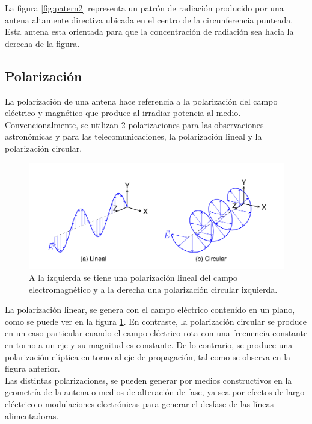 La figura \ref{fig:patern2} representa un patrón de radiación producido por una antena altamente directiva ubicada en el centro de la circunferencia punteada. Esta antena esta orientada para que la concentración de radiación sea hacia la derecha de la figura.

\subsection{Polarización}

La polarización de una antena hace referencia a la polarización del campo eléctrico y magnético que produce al irradiar potencia al medio. Convencionalmente, se utilizan 2 polarizaciones para las observaciones astronómicas y para las telecomunicaciones, la polarización lineal y la polarización circular.\\

\begin{figure}
    \centering
    \includegraphics[width = 15cm]{img/pol.png}
    \caption{A la izquierda se tiene una polarización lineal del campo electromagnético y a la derecha una polarización circular izquierda\cite{Astudillo2014}.}
    \label{fig:pol}
\end{figure}

La polarización linear, se genera con el campo eléctrico contenido en un plano, como se puede ver en la figura \ref{fig:pol}. En contraste, la polarización circular se produce en un caso particular cuando el campo eléctrico rota con una frecuencia constante en torno a un eje y su magnitud es constante. De lo contrario, se produce una polarización elíptica en torno al eje de propagación, tal como se observa en la figura anterior.\\

Las distintas polarizaciones, se pueden generar por medios constructivos en la geometría de la antena o medios de alteración de fase, ya sea por efectos de largo eléctrico o modulaciones electrónicas para generar el desfase de las líneas alimentadoras.

